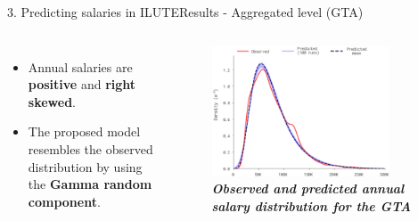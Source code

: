 \documentclass[aspectratio=169]{beamer}
\begin{document}
\begin{frame}{3. Predicting salaries in ILUTE}{Results - Aggregated level (GTA)}
    \vspace*{-20pt}
    \begin{columns}
            \begin{itemize}
                \setlength{\itemsep}{10pt} %
                \item \fontsize{9pt}{9pt}\selectfont Annual salaries are \textbf{positive} and \textbf{right skewed}.
                \item \fontsize{9pt}{9pt}\selectfont The proposed model resembles the observed distribution by using the \textbf{Gamma random component}.
            \end{itemize}
            \begin{figure}
                \centering
                \includegraphics[width=0.85\textwidth]{./images/salary.png}
                \captionsetup{labelformat=empty}
                \setlength{\abovecaptionskip}{5pt} %
                \caption{\fontsize{8pt}{8pt}\selectfont \textbf{\textit{Observed and predicted annual salary distribution for the GTA}}}
            \end{figure}
    \end{columns}
\end{frame}
\end{document}
